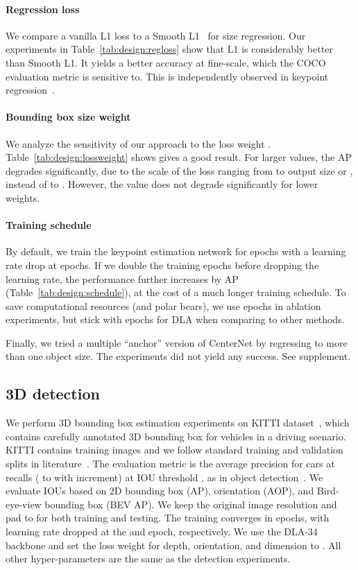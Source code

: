 \documentclass[10pt,twocolumn,letterpaper]{article}
\begin{document}
\paragraph{Regression loss}
We compare a vanilla L1 loss to a Smooth L1~\cite{girshick2015fast} for size regression.
Our experiments in Table~\ref{tab:design:regloss} show that L1 is considerably better than Smooth L1.
It yields a better accuracy at fine-scale, which the COCO evaluation metric is sensitive to.
This is independently observed in keypoint regression~\cite{sun2017compositional,sun2018integral}.

\paragraph{Bounding box size weight}
We analyze the sensitivity of our approach to the loss weight .
Table~\ref{tab:design:lossweight} shows  gives a good result.
For larger values, the AP degrades significantly, due to the scale of the loss ranging from  to output size  or , instead of  to .
However, the value does not degrade significantly for lower weights.

\paragraph{Training schedule}
By default, we train the keypoint estimation network for  epochs with a learning rate drop at  epochs.
If we double the training epochs before dropping the learning rate, the performance further increases by  AP (Table~\ref{tab:design:schedule}), at the cost of a much longer training schedule.
To save computational resources (and polar bears), we use  epochs in ablation experiments, but stick with  epochs for DLA when comparing to other methods.

Finally, we tried a multiple ``anchor'' version of CenterNet by regressing to more than one object size.
The experiments did not yield any success. See supplement.

\subsection{3D detection}

We perform 3D bounding box estimation experiments on KITTI dataset~\cite{Geiger2012CVPR}, which contains carefully annotated 3D bounding box for vehicles in a driving scenario.
KITTI contains  training images and we follow standard training and validation splits in literature~\cite{xiang2017subcategory,chen20153d}.
The evaluation metric is the average precision for cars at  recalls ( to  with  increment) at IOU threshold , as in object detection~\cite{pascal-voc-2012}. 
We evaluate IOUs based on 2D bounding box (AP), orientation (AOP), and Bird-eye-view bounding box (BEV AP).
We keep the original image resolution and pad to  for both training and testing.
The training converges in  epochs, with learning rate dropped at the  and  epoch, respectively.
We use the DLA-34 backbone and set the loss weight for depth, orientation, and dimension to .
All other hyper-parameters are the same as the detection experiments.
\end{document}
